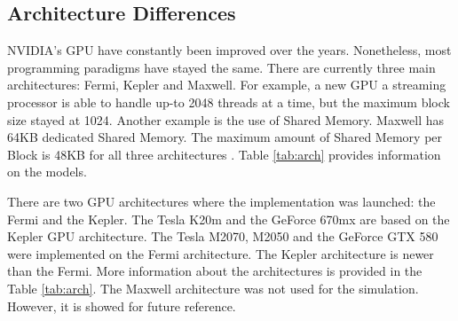 \subsection{Architecture Differences}

  NVIDIA's GPU have constantly been improved over the years. Nonetheless, most programming paradigms have stayed the same. There are currently three main architectures: Fermi, Kepler and Maxwell. For example, a new GPU a streaming processor is able to handle up-to 2048 threads at a time, but the maximum block size stayed at 1024. Another example is the use of Shared Memory. Maxwell has 64KB dedicated Shared Memory. The maximum amount of Shared Memory per Block is 48KB for all three architectures \cite{hoermanngpu}. Table \ref{tab:arch} provides information on the models.
   
  There are two GPU architectures where the implementation was launched: the Fermi and the Kepler. The Tesla K20m and the GeForce 670mx are based on the Kepler GPU architecture. The Tesla M2070, M2050 and the GeForce GTX 580 were implemented on the Fermi architecture. The Kepler architecture is newer than the Fermi. More information about the architectures is provided in the Table \ref{tab:arch}. The Maxwell architecture was not used for the simulation. However, it is showed for future reference.
  
